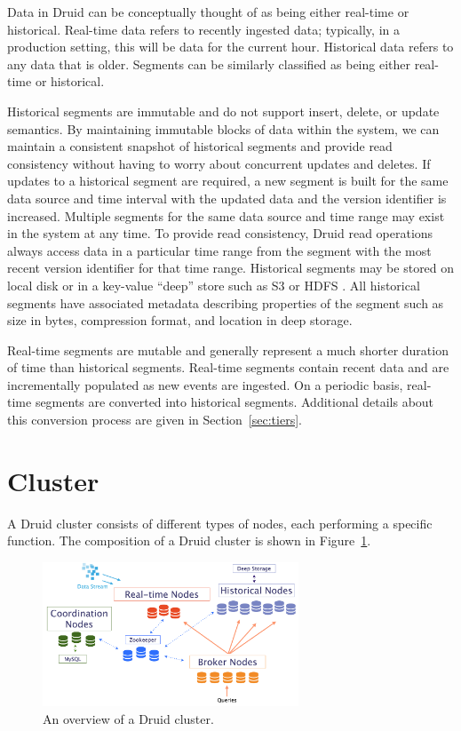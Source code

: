 \documentclass{vldb}
\begin{document}
Data in Druid can be conceptually thought of as being either real-time
or historical. Real-time data refers to recently ingested data;
typically, in a production setting, this will be data for the current
hour. Historical data refers to any data that is older. Segments can
be similarly classified as being either real-time or historical.

Historical segments are immutable and do not support insert, delete,
or update semantics. By maintaining immutable blocks of data within
the system, we can maintain a consistent snapshot of historical
segments and provide read consistency without having to worry about
concurrent updates and deletes. If updates to a historical segment are
required, a new segment is built for the same data source and time
interval with the updated data and the version identifier is
increased. Multiple segments for the same data source and time range
may exist in the system at any time. To provide read consistency,
Druid read operations always access data in a particular time range
from the segment with the most recent version identifier for that time
range. Historical segments may be stored on local disk or in a
key-value “deep” store such as S3 \cite{decandia2007dynamo} or HDFS \cite{shvachko2010hadoop}. All historical
segments have associated metadata describing properties of the segment
such as size in bytes, compression format, and location in deep
storage.

Real-time segments are mutable and generally represent a much shorter
duration of time than historical segments. Real-time segments contain
recent data and are incrementally populated as new events are
ingested. On a periodic basis, real-time segments are converted into
historical segments. Additional details about this conversion process
are given in Section~\ref{sec:tiers}.

\section{Cluster}
\label{sec:cluster}
A Druid cluster consists of different types of nodes, each performing
a specific function. The composition of a Druid cluster is shown in
Figure~\ref{fig:druid_cluster}.

\begin{figure}
\centering
\includegraphics[width = 3in]{druid_cluster}
\caption{An overview of a Druid cluster.}
\label{fig:druid_cluster}
\end{figure}
\end{document}

